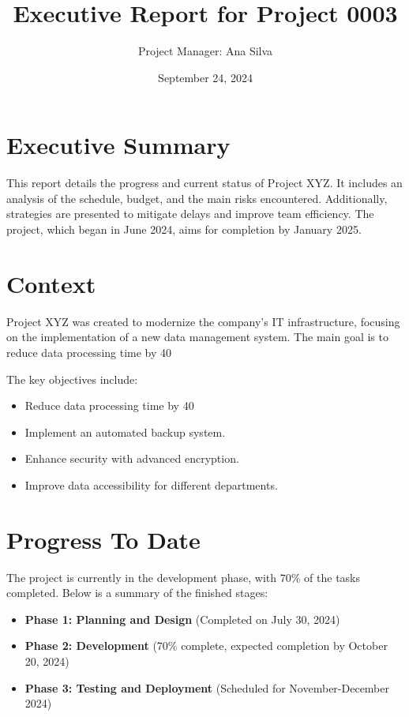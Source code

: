 \documentclass[12pt]{article}
\title{Executive Report for Project 0003}
\author{Project Manager: Ana Silva}
\date{September 24, 2024}
\begin{document}
\maketitle

\tableofcontents
\newpage

\section*{Executive Summary}
This report details the progress and current status of Project XYZ. It includes an analysis of the schedule, budget, and the main risks encountered. Additionally, strategies are presented to mitigate delays and improve team efficiency. The project, which began in June 2024, aims for completion by January 2025.

\section*{Context}
Project XYZ was created to modernize the company’s IT infrastructure, focusing on the implementation of a new data management system. The main goal is to reduce data processing time by 40%

The key objectives include:
\begin{itemize}
    \item Reduce data processing time by 40%
    \item Implement an automated backup system.
    \item Enhance security with advanced encryption.
    \item Improve data accessibility for different departments.
\end{itemize}

\section*{Progress To Date}
The project is currently in the development phase, with 70\% of the tasks completed. Below is a summary of the finished stages:

\begin{itemize}
    \item \textbf{Phase 1: Planning and Design} (Completed on July 30, 2024)
    \item \textbf{Phase 2: Development} (70\% complete, expected completion by October 20, 2024)
    \item \textbf{Phase 3: Testing and Deployment} (Scheduled for November-December 2024)
\end{itemize}
\end{document}
